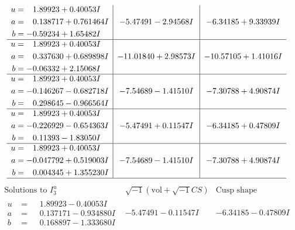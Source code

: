 \documentclass[1p]{elsarticle_modified}
\theoremstyle{definition}
\newcommand{\I}{\sqrt{-1}}
\begin{document}
$$\begin{array}{c|c|c}
\begin{aligned}
u &= \phantom{-}1.89923 + 0.40053 I \\
a &= \phantom{-}0.138717 + 0.761464 I \\
b &= -0.59234 + 1.65482 I\end{aligned}
 & -5.47491 - 2.94568 I & -6.34185 + 9.33939 I \\ \hline\begin{aligned}
u &= \phantom{-}1.89923 + 0.40053 I \\
a &= \phantom{-}0.337630 + 0.689898 I \\
b &= -0.06332 + 2.15068 I\end{aligned}
 & -11.01840 + 2.98573 I & -10.57105 + 1.41016 I \\ \hline\begin{aligned}
u &= \phantom{-}1.89923 + 0.40053 I \\
a &= -0.146267 - 0.682718 I \\
b &= \phantom{-}0.298645 - 0.966564 I\end{aligned}
 & -7.54689 - 1.41510 I & -7.30788 + 4.90874 I \\ \hline\begin{aligned}
u &= \phantom{-}1.89923 + 0.40053 I \\
a &= -0.226929 - 0.654363 I \\
b &= \phantom{-}0.11393 - 1.83050 I\end{aligned}
 & -5.47491 + 0.11547 I & -6.34185 + 0.47809 I \\ \hline\begin{aligned}
u &= \phantom{-}1.89923 + 0.40053 I \\
a &= -0.047792 + 0.519003 I \\
b &= \phantom{-}0.004345 + 1.355230 I\end{aligned}
 & -7.54689 - 1.41510 I & -7.30788 + 4.90874 I\\
 \hline 
 \end{array}$$\newpage$$\begin{array}{c|c|c}  
\text{Solutions to }I^u_{3}& \I (\text{vol} + \sqrt{-1}CS) & \text{Cusp shape}\\
 \hline 
\begin{aligned}
u &= \phantom{-}1.89923 - 0.40053 I \\
a &= \phantom{-}0.137171 - 0.934880 I \\
b &= \phantom{-}0.168897 - 1.333680 I\end{aligned}
 & -5.47491 - 0.11547 I & -6.34185 - 0.47809 I \\ \hline\begin{aligned}

\end{aligned}
\end{array}$$
\end{document}
